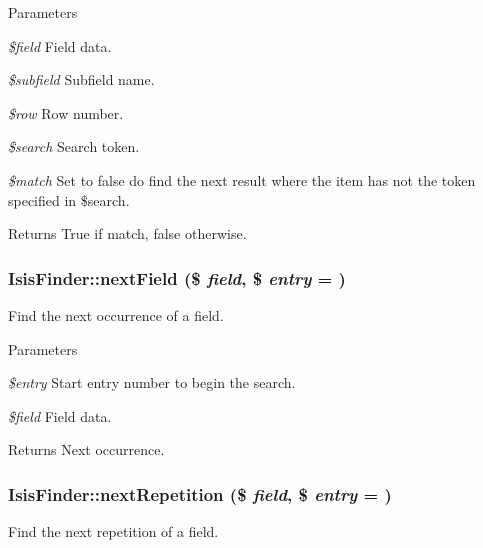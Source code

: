 \begin{DoxyParams}{Parameters}
\item[{\em \$field}]Field data.\item[{\em \$subfield}]Subfield name.\item[{\em \$row}]Row number.\item[{\em \$search}]Search token.\item[{\em \$match}]Set to false do find the next result where the item has not the token specified in \$search.\end{DoxyParams}
\begin{DoxyReturn}{Returns}
True if match, false otherwise. 
\end{DoxyReturn}
\hypertarget{classIsisFinder_a7d708e281bea35ee38f5875c8f2cad8d}{
\subsubsection[{nextField}]{\setlength{\rightskip}{0pt plus 5cm}IsisFinder::nextField (\$ {\em field}, \/  \$ {\em entry} = {})}}
\label{classIsisFinder_a7d708e281bea35ee38f5875c8f2cad8d}
Find the next occurrence of a field.


\begin{DoxyParams}{Parameters}
\item[{\em \$entry}]Start entry number to begin the search.\item[{\em \$field}]Field data.\end{DoxyParams}
\begin{DoxyReturn}{Returns}
Next occurrence. 
\end{DoxyReturn}
\hypertarget{classIsisFinder_ac4e3a8f45995cbf940b3f2899b71bd1e}{
\subsubsection[{nextRepetition}]{\setlength{\rightskip}{0pt plus 5cm}IsisFinder::nextRepetition (\$ {\em field}, \/  \$ {\em entry} = {})}}
\label{classIsisFinder_ac4e3a8f45995cbf940b3f2899b71bd1e}
Find the next repetition of a field.


